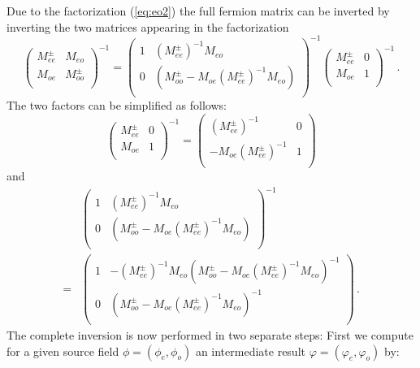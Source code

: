 Due to the factorization (\ref{eq:eo2}) the full fermion matrix can be
inverted by inverting the two matrices appearing in the factorization
\[
\begin{pmatrix}
  M_{ee}^\pm & M_{eo} \\
  M_{oe}    & M_{oo}^\pm \\
\end{pmatrix}^{-1}
=
\begin{pmatrix}
  1       & (M_{ee}^\pm)^{-1}M_{eo}\\
  0       & (M_{oo}^\pm-M_{oe}(M_{ee}^\pm)^{-1}M_{eo})\\
\end{pmatrix}^{-1}
\begin{pmatrix}
  M_{ee}^\pm & 0 \\
  M_{oe}   & 1 \\
\end{pmatrix}^{-1}\, .
\]
The two factors can be simplified as follows:
\[
\begin{pmatrix}
  M_{ee}^\pm & 0 \\
  M_{oe}   & 1 \\
\end{pmatrix}^{-1}
=
\begin{pmatrix}
      (M_{ee}^\pm)^{-1} & 0 \\
      -M_{oe} (M_{ee}^{\pm})^{-1}  & 1 \\
    \end{pmatrix}
\]
and 
\[
\begin{split}
  &\begin{pmatrix}
    1       & (M_{ee}^\pm)^{-1}M_{eo}\\
    0       & (M_{oo}^\pm-M_{oe}(M_{ee}^\pm)^{-1}M_{eo})\\
  \end{pmatrix}^{-1}
  \\=&
  \begin{pmatrix}
    1       & -(M_{ee}^\pm)^{-1}M_{eo}(M_{oo}^\pm-M_{oe}(M_{ee}^\pm)^{-1}M_{eo})^{-1}  \\
    0       & (M_{oo}^\pm-M_{oe}(M_{ee}^\pm)^{-1}M_{eo})^{-1}\\
  \end{pmatrix}\, .
\end{split}
\]
The complete inversion is now performed in two separate steps: First
we compute for a given source field $\phi=(\phi_e,\phi_o)$ an intermediate 
result $\varphi=(\varphi_e,\varphi_o)$ by:
